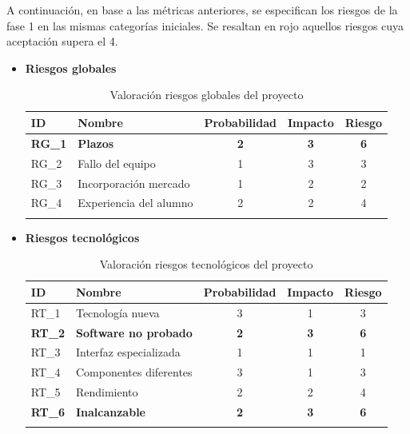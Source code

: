 \begin{enumerate}
\begin{itemize}
\endgroup
\end{itemize}


A continuación, en base a las métricas anteriores, se especifican los riesgos de la fase 1 en las mismas categorías iniciales. Se resaltan en rojo aquellos riesgos cuya aceptación supera el 4.

\begin{itemize}

\item \textbf{Riesgos globales}
\begingroup
\renewcommand\arraystretch{1.3}

\begin{longtable}{l p{5cm} ccc}
\hline
\textbf{ID} & \textbf{Nombre} & \textbf{Probabilidad} & \textbf{Impacto} & \textbf{Riesgo} \\
\hline
\endhead
\endfoot
\textbf{RG\_1} & 
\textbf{Plazos} &
\textbf{2} &
\textbf{3} &
\textbf{6} 
 \\
RG\_2 & 
Fallo del equipo &
1 &
3 &
3 
 \\
RG\_3 & 
Incorporación mercado &
1 &
2 &
2 
 \\
RG\_4 & 
Experiencia del alumno &
2 &
2 &
4 
 \\
\hline
\caption{Valoración riesgos globales del proyecto}\label{ries_glob_valoracion}\\
\end{longtable}

\item \textbf{Riesgos tecnológicos}
\begin{longtable}{l p{5cm} ccc}
\hline
\textbf{ID} & \textbf{Nombre} & \textbf{Probabilidad} & \textbf{Impacto} & \textbf{Riesgo} \\
\hline
\endhead
\endfoot
RT\_1 & 
Tecnología nueva &
3 &
1 &
3 
 \\
\textbf{RT\_2} & 
\textbf{Software no probado} &
\textbf{2} &
\textbf{3} &
\textbf{6} 
 \\
RT\_3 & 
Interfaz especializada &
1 &
1 &
1 
 \\
RT\_4 & 
Componentes diferentes &
3 &
1 &
3 
 \\
RT\_5 & 
Rendimiento &
2 &
2 &
4 
 \\
\textbf{RT\_6} & 
\textbf{Inalcanzable} &
\textbf{2} &
\textbf{3} &
\textbf{6} 
 \\
\hline
\caption{Valoración riesgos tecnológicos del proyecto}\label{ries_tecno_valoracion}\\
\end{longtable}


\end{itemize}
\end{enumerate}
